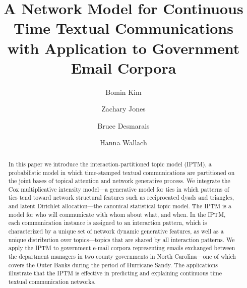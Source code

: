 \documentclass[a4paper]{article}
\title{A Network Model for Continuous Time Textual Communications\\ with Application to Government Email Corpora}%
\author[1]{Bomin Kim}
\author[1]{Zachary Jones}
\author[1]{Bruce Desmarais}
\author[2,3]{Hanna Wallach}
\affil[1]{Pennsylvania State University}
\affil[2]{Microsoft Research NYC}
\affil[3]{University of Massachusetts Amherst}
\begin{document}
\maketitle
\begin{abstract}

\noindent In this paper we introduce the interaction-partitioned topic model (IPTM), a probabilistic model in which time-stamped textual communications are partitioned on the joint bases of topical attention and network generative process. We integrate the Cox multiplicative intensity model---a generative model for ties in which patterns of ties tend toward network structural features such as reciprocated dyads and triangles, and latent Dirichlet allocation---the canonical statistical topic model. The IPTM is a model for who will communicate with whom about what, and when. In the IPTM, each communication instance is assigned to an interaction pattern, which is characterized by a unique set of network dynamic generative features, as well as a unique distribution over topics---topics that are shared by all interaction patterns. We apply the IPTM to government e-mail corpora representing emails exchanged between the department managers in two county governments in North Carolina---one of which covers the Outer Banks during the period of Hurricane Sandy. The applications illustrate that the IPTM is effective in predicting and explaining continuous time textual communication networks. 

\end{abstract}
\end{document}
